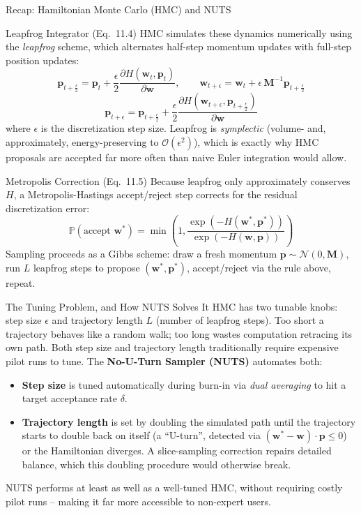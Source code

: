 \documentclass[aspectratio=169,10pt]{beamer}
\newcommand{\ww}{\mathbf{w}}
\newcommand{\pp}{\mathbf{p}}
\newcommand{\Prob}{\mathbb{P}}
\begin{document}
\begin{frame}[allowframebreaks]{Recap: Hamiltonian Monte Carlo (HMC) and NUTS}
\framebreak

\begin{block}{Leapfrog Integrator (Eq.\ 11.4)}
  HMC simulates these dynamics numerically using the \emph{leapfrog}
  scheme, which alternates half-step momentum updates with full-step
  position updates:
  \[
    \pp_{t+\frac{\epsilon}{2}} = \pp_t + \frac{\epsilon}{2}\frac{\partial H(\ww_t,\pp_t)}{\partial \ww}, \qquad
    \ww_{t+\epsilon} = \ww_t + \epsilon\, \mathbf{M}^{-1}\pp_{t+\frac{\epsilon}{2}}
  \]
  \[
    \pp_{t+\epsilon} = \pp_{t+\frac{\epsilon}{2}} + \frac{\epsilon}{2}\frac{\partial H(\ww_{t+\epsilon},\pp_{t+\frac{\epsilon}{2}})}{\partial \ww}
  \]
  where $\epsilon$ is the discretization step size. Leapfrog is
  \emph{symplectic} (volume- and, approximately, energy-preserving to
  $\mathcal{O}(\epsilon^2)$), which is exactly why HMC proposals are
  accepted far more often than naive Euler integration would allow.
\end{block}

\begin{block}{Metropolis Correction (Eq.\ 11.5)}
  Because leapfrog only approximately conserves $H$, a Metropolis-Hastings
  accept/reject step corrects for the residual discretization error:
  \[
    \Prob(\text{accept } \ww^*) = \min\left(1, \frac{\exp(-H(\ww^*,\pp^*))}{\exp(-H(\ww,\pp))}\right)
  \]
  Sampling proceeds as a Gibbs scheme: draw a fresh momentum $\pp \sim
  \mathcal{N}(0,\mathbf{M})$, run $L$ leapfrog steps to propose
  $(\ww^*,\pp^*)$, accept/reject via the rule above, repeat.
\end{block}

\framebreak

\begin{alertblock}{The Tuning Problem, and How NUTS Solves It}
  HMC has two tunable knobs: step size $\epsilon$ and trajectory length $L$
  (number of leapfrog steps). Too short a trajectory behaves like a random
  walk; too long wastes computation retracing its own path. Both step size
  and trajectory length traditionally require expensive pilot runs to tune.
  The \textbf{No-U-Turn Sampler (NUTS)} automates both:
  \begin{itemize}
    \item \textbf{Step size} is tuned automatically during burn-in via
      \emph{dual averaging} to hit a target acceptance rate $\delta$.
    \item \textbf{Trajectory length} is set by doubling the simulated path
      until the trajectory starts to double back on itself (a ``U-turn'',
      detected via $(\ww^* - \ww)\cdot\pp \le 0$) or the Hamiltonian
      diverges. A slice-sampling correction repairs detailed balance, which
      this doubling procedure would otherwise break.
  \end{itemize}
  NUTS performs at least as well as a well-tuned HMC, without requiring
  costly pilot runs -- making it far more accessible to non-expert users.
\end{alertblock}


\end{frame}
\end{document}

